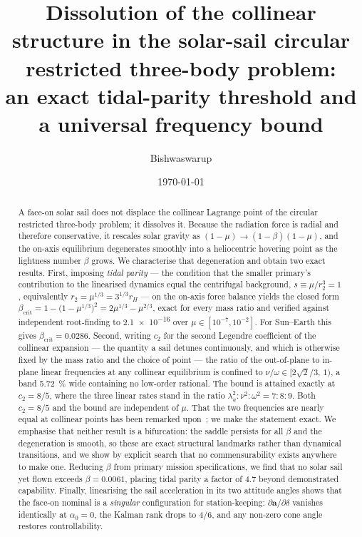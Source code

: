 \documentclass[11pt,a4paper]{article}
\title{\bfseries Dissolution of the collinear structure in the
solar-sail circular restricted three-body problem:\\
an exact tidal-parity threshold and a universal frequency bound}
\author[1]{Bishwaswarup}
\affil[1]{\small Indian Institute of Science, Bangalore 560012, India\\
\texttt{bishwaswarup@iisc.ac.in}}
\date{\today}
\begin{document}
\maketitle

\begin{abstract}
\noindent
A face-on solar sail does not displace the collinear Lagrange point of the
circular restricted three-body problem; it dissolves it. Because the radiation
force is radial and therefore conservative, it rescales solar gravity as
$(1-\mu)\to(1-\beta)(1-\mu)$, and the on-axis equilibrium degenerates smoothly
into a heliocentric hovering point as the lightness number $\beta$ grows. We
characterise that degeneration and obtain two exact results. First, imposing
\emph{tidal parity} --- the condition that the smaller primary's contribution to
the linearised dynamics equal the centrifugal background, $s\equiv\mu/r_2^3=1$,
equivalently $r_2=\mu^{1/3}=3^{1/3}r_H$ --- on the on-axis force balance yields
the closed form
$\beta_{\mathrm{crit}}=1-\bigl(1-\mu^{1/3}\bigr)^2=2\mu^{1/3}-\mu^{2/3}$,
exact for every mass ratio and verified against independent root-finding to
\num{2.1e-16} over $\mu\in[10^{-7},10^{-2}]$. For Sun--Earth this gives
$\beta_{\mathrm{crit}}=0.0286$. Second, writing $c_2$ for the second Legendre
coefficient of the collinear expansion --- the quantity a sail detunes
continuously, and which is otherwise fixed by the mass ratio and the choice of
point --- the ratio of the out-of-plane to in-plane linear frequencies at any
collinear equilibrium is confined to $\nu/\omega\in[2\sqrt2/3,\,1)$, a band
\SI{5.72}{\percent} wide containing no low-order rational. The bound is attained
exactly at $c_2=8/5$, where the three linear rates stand in the ratio
$\lambda_u^2:\nu^2:\omega^2=7:8:9$. Both $c_2=8/5$ and the bound are independent
of $\mu$. That the two frequencies are nearly equal at collinear points has been
remarked upon~\cite{ceccaroni2016}; we make the statement exact. We emphasise that neither result is a bifurcation: the saddle persists
for all $\beta$ and the degeneration is smooth, so these are exact structural
landmarks rather than dynamical transitions, and we show by explicit search that
no commensurability exists anywhere to make one. Reducing $\beta$ from primary
mission specifications, we find that no solar sail yet flown exceeds
$\beta=0.0061$, placing tidal parity a factor of $4.7$ beyond demonstrated
capability. Finally, linearising the sail acceleration in its two attitude
angles shows that the face-on nominal is a \emph{singular} configuration for
station-keeping: $\partial\bm{a}/\partial\delta$ vanishes identically at
$\alpha_0=0$, the Kalman rank drops to $4/6$, and any non-zero cone angle
restores controllability.
\end{abstract}
\end{document}
